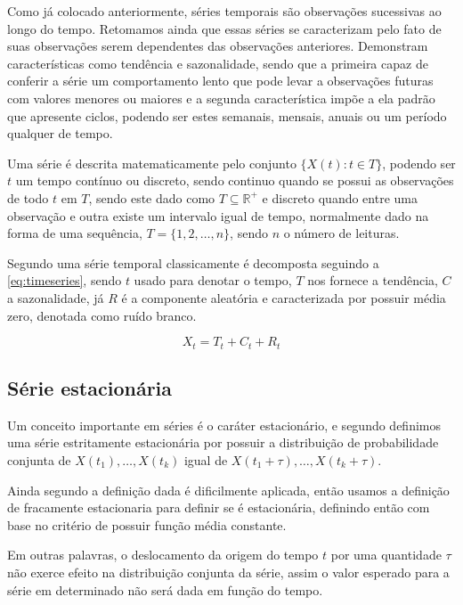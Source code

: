 \documentclass[
	12pt,
	oneside,
	a4paper,
	english,
	brazil
]{abntex2}
\begin{document}
Como já colocado anteriormente, séries temporais são observações sucessivas ao 
longo do tempo. Retomamos ainda que essas séries se caracterizam pelo fato de 
suas observações serem dependentes das observações anteriores. Demonstram 
características como tendência e sazonalidade, sendo que a primeira capaz de 
conferir a série um comportamento lento que pode levar a observações futuras com 
valores menores ou maiores e a segunda característica impõe a ela padrão que 
apresente ciclos, podendo ser estes semanais, mensais, anuais ou um período 
qualquer de tempo.

Uma série é descrita matematicamente pelo conjunto $\{X(t): t \in T\}$, podendo 
ser $t$ um tempo contínuo ou discreto, sendo continuo quando se possui as 
observações de todo $t$ em $T$, sendo este dado como $T \subseteq 
\mathbb{R}^{+}$ e discreto quando entre uma observação e outra existe um 
intervalo igual de tempo, normalmente dado na forma de uma sequência, $T = \{1, 
2, \ldots, n\}$, sendo $n$ o número de leituras.

Segundo  uma série temporal classicamente é decomposta 
seguindo a \autoref{eq:timeseries}, sendo $t$ usado para denotar o tempo, $T$ 
nos fornece a tendência, $C$ a sazonalidade, já $R$ é a componente aleatória e 
caracterizada por possuir média zero, denotada como ruído branco.

\begin{equation}
	\label{eq:timeseries}
	X_t = T_t + C_t + R_t
\end{equation}

\subsection{Série estacionária}

Um conceito importante em séries é o caráter estacionário, e segundo 
 definimos uma série estritamente estacionária por possuir a 
distribuição de probabilidade conjunta de $X(t_1), \ldots, X(t_k)$ igual de 
$X(t_1 + \tau), \ldots, X(t_k + \tau)$.

Ainda segundo  a definição dada é dificilmente aplicada, 
então usamos a definição de fracamente estacionaria para definir se é 
estacionária, definindo então com base no critério de possuir função média 
constante.

Em outras palavras, o deslocamento da origem do tempo $t$ por uma quantidade 
$\tau$ não exerce efeito na distribuição conjunta da série, assim o valor 
esperado para a série em determinado não será dada em função do tempo.
\end{document}
